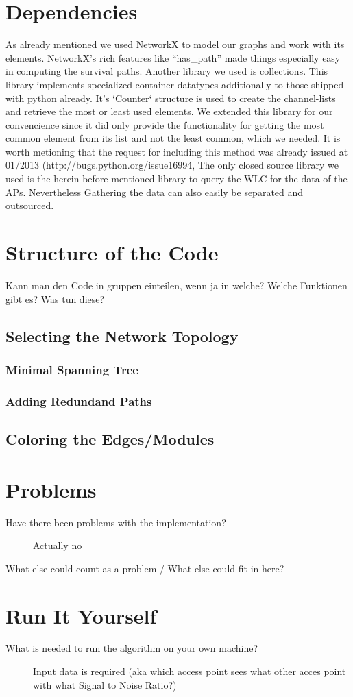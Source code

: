 \section{Dependencies}
  As already mentioned we used NetworkX\cite{hagberg-2008-exploring} to model our graphs and work with its elements.
  NetworkX's rich features like ``has\_path'' made things especially easy in computing the survival paths.
  Another library we used is collections. \cite{python_collections}
  This library implements specialized container datatypes additionally to those shipped with python already.
  It's `Counter` structure is used to create the channel-lists and retrieve the most or least used elements.
  We extended this library for our convencience since it did only provide the functionality for getting the most common element from its list and not the least common,
  which we needed. It is worth metioning that the request for including this method was already issued at 01/2013 (http://bugs.python.org/issue16994,
  The only closed source library we used is the herein before mentioned library to query the WLC for the data of the APs. Nevertheless Gathering the data can also
  easily be separated and outsourced.
\section{Structure of the Code}
  Kann man den Code in gruppen einteilen, wenn ja in welche? Welche Funktionen gibt es? Was tun diese?
  \subsection{Selecting the Network Topology}
    \subsubsection{Minimal Spanning Tree}
    \subsubsection{Adding Redundand Paths}
  \subsection{Coloring the Edges/Modules}
\section{Problems}
  \begin{description}
   \item[Have there been problems with the implementation?]
   Actually no
   \item[What else could count as a problem / What else could fit in here?]
  \end{description}
\section{Run It Yourself}
  \begin{description}
   \item[What is needed to run the algorithm on your own machine?]
    Input data is required (aka which access point sees what other acces point with what Signal to Noise Ratio?) \newline
  \end{description}
